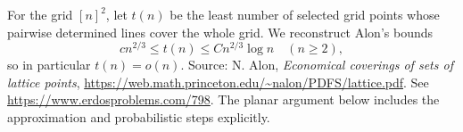 For the grid \([n]^2\), let \(t(n)\) be the least number of
selected grid points whose pairwise determined lines cover
the whole grid. We reconstruct Alon's bounds
\[
 c n^{2/3}\leq t(n)\leq C n^{2/3}\log n
 \quad(n\geq2),
\]
so in particular \(t(n)=o(n)\).
Source: N. Alon, \emph{Economical coverings of sets of lattice
points}, \url{https://web.math.princeton.edu/~nalon/PDFS/lattice.pdf}.
See \url{https://www.erdosproblems.com/798}.
The planar argument below includes the approximation and
probabilistic steps explicitly.
